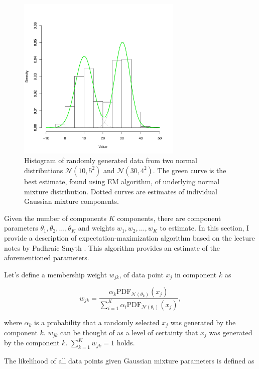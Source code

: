 \documentclass[thesis=B,english]{FITthesis}[2012/06/26]
\begin{document}
\begin{figure}
	\centering
 	\includegraphics[width=0.7\textwidth]{gaussian_mixture_estimate}
 	\caption{Histogram of randomly generated data from two normal distributions $\mathcal{N}(10,5^2)$ and $\mathcal{N}(30,4^2)$. The green curve is the best estimate, found using EM algorithm, of underlying normal mixture distribution. Dotted curves are estimates of individual Gaussian mixture components.}
 	\label{fig:gaussian_mixture_est}
\end{figure}

Given the number of components $K$ components, there are component parameters $\theta_1, \theta_2, \dots, \theta_K$ and weights $w_1, w_2, \dots, w_K$ to estimate. In this section, I provide a description of expectation-maximization algorithm based on the lecture notes by Padhraic Smyth \cite{gaussian-mixture-em}. This algorithm provides an estimate of the aforementioned parameters.

Let's define a membership weight $w_{jk}$, of data point $x_j$ in component $k$ as

\begin{equation*}
w_{jk} = \frac{\alpha_k \text{PDF}_{\mathcal{N}(\theta_k)}(x_j)}{\sum_{i=1}^K \alpha_i \text{PDF}_{\mathcal{N}(\theta_i)}(x_j)},
\end{equation*}

where $\alpha_k$ is a probability that a randomly selected $x_j$ was generated by the component $k$. $w_{jk}$ can be thought of as a level of certainty that $x_j$ was generated by the component $k$. $\sum_{k=1}^K w_{jk} = 1$ holds.

The likelihood of all data points given Gaussian mixture parameters is defined as
\end{document}
